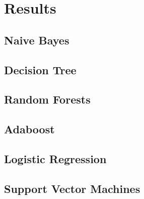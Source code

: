 \section{Results} \label{Results}

\subsection{Naive Bayes}

\subsection{Decision Tree}

\subsection{Random Forests}

\subsection{Adaboost}

\subsection{Logistic Regression}

\subsection{Support Vector Machines}
